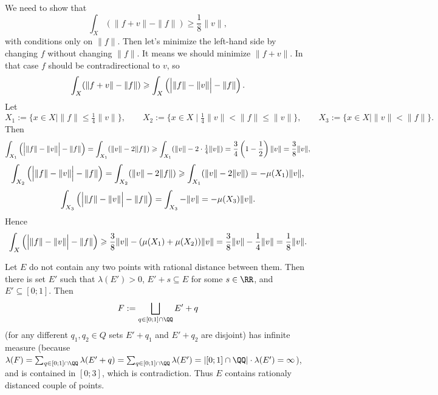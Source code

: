\documentclass[12pt,a4paper]{article}
\begin{document}
    \begin{enumproblem}
        We need to show that
        \[\int_X (\|f + v\| - \|f\|) \geqslant \frac{1}{8} \|v\|,\]
        with conditions only on $\|f\|$. Then let's minimize the left-hand side by changing $f$ without changing $\|f\|$. It means we should minimize $\|f + v\|$. In that case $f$ should be contradirectional to $v$, so
        \[\int_X (\|f + v\| - \|f\|) \geqslant \int_X \left(\Bigl|\|f\| - \|v\|\Bigr| - \|f\|\right).\]
        Let
        \[
            X_1 := \{x \in X \mid \|f\| \leqslant \tfrac{1}{4} \|v\|\},
            \qquad
            X_2 := \{x \in X \mid \tfrac{1}{4} \|v\| < \|f\| \leqslant \|v\|\},
            \qquad
            X_3 := \{x \in X \mid \|v\| < \|f\|\}.
        \]
        Then
        \[
            \int_{X_1} \left(\Bigl|\|f\| - \|v\|\Bigr| - \|f\|\right)
            = \int_{X_1} (\|v\| - 2\|f\|)
            \geqslant \int_{X_1} (\|v\| - 2 \cdot \tfrac{1}{4}\|v\|)
            = \frac{3}{4}\left(1 - \frac{1}{2}\right) \|v\|
            = \frac{3}{8} \|v\|,
        \]
        \[
            \int_{X_2} \left(\Bigl|\|f\| - \|v\|\Bigr| - \|f\|\right)
            = \int_{X_2} (\|v\| - 2\|f\|)
            \geqslant \int_{X_1} (\|v\| - 2\|v\|)
            = -\mu(X_1) \|v\|,
        \]
        \[
            \int_{X_3} \left(\Bigl|\|f\| - \|v\|\Bigr| - \|f\|\right)
            = \int_{X_3} -\|v\|
            = -\mu(X_3) \|v\|.
        \]
        Hence
        \[
            \int_X \left(\Bigl|\|f\| - \|v\|\Bigr| - \|f\|\right)
            \geqslant \frac{3}{8} \|v\| - (\mu(X_1) + \mu(X_2)) \|v\|
            = \frac{3}{8} \|v\| - \frac{1}{4}\|v\|
            = \frac{1}{8} \|v\|.
        \]
    \end{enumproblem}

    \begin{enumproblem}
        Let $E$ do not contain any two points with rational distance between them. Then there is set $E'$ such that $\lambda(E') > 0$, $E' + s \subseteq E$ for some $s \in \RR$, and $E' \subseteq [0; 1]$. Then
        \[F := \bigsqcup_{q \in [0; 1] \cap \QQ} E' + q\]
        (for any different $q_1, q_2 \in Q$ sets $E' + q_1$ and $E' + q_2$ are disjoint) has infinite measure (because $\lambda(F) = \sum_{q \in [0; 1] \cap \QQ} \lambda(E' + q) = \sum_{q \in [0; 1] \cap \QQ} \lambda(E') = |[0; 1] \cap \QQ| \cdot \lambda(E') = \infty$), and is contained in $[0; 3]$, which is contradiction. Thus $E$ contains rationaly distanced couple of points. 
    \end{enumproblem}
\end{document}
